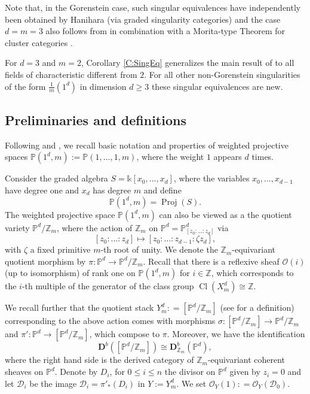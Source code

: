 \documentclass[a4paper,11pt, reqno]{amsart}
\def\P{\mathbb P}
\def\Z{\mathbb Z}
\def\DD{\mathbf D}
\def\OO{\mathcal O}
\def\sD{\mathscr{D}}
\def\Proj{{\operatorname{Proj}}}
\def\Cl{{\operatorname{Cl}}}
\def\Db{\DD^b}
\theoremstyle{plain}
\theoremstyle{definition}
\numberwithin{equation}{section}
\begin{document}
Note that, in the Gorenstein case, such singular equivalences have independently been obtained by Hanihara \cite{Hanihara1, Hanihara2} (via graded singularity categories) and the case  $d=m=3$
also follows from \cite{BIRSc} in combination with a Morita-type Theorem for cluster categories \cite{KellerReiten08}.

For $d=3$ and $m=2$, 
Corollary \ref{C:SingEq} generalizes the main result of \cite{KalckNewSingular} to all fields of characteristic different from $2$. 
For all other non-Gorenstein singularities of the form $\frac{1}{m}(1^d)$ in dimension $d\geq 3$  these singular equivalences are new. 




\subsection{Preliminaries and definitions}\label{sub:prelim} 
Following \cite{dolgachev} and \cite{kawamata0}, we recall basic notation and properties of weighted projective spaces $\P(1^d, m):=\P (1 , \ldots , 1 , m)$, where the weight $1$ appears $d$ times.


Consider the graded algebra $S= \mathbb{k}[x_0 , \ldots , x_d ]$, where the variables $x_0 , \ldots , x_{d-1} $ have degree one and $x_d$ has degree $m$ and define
\[
 \P (1^d , m ) = \Proj ( S ).
\] 
The weighted projective space $\P ( 1^d , m )$ can also be viewed as a the quotient variety $\P^d / \Z_m $, where the action of $\Z_m$ on $\P^d = \P^d_{[z_0 : \ldots : z_d ]}$ via 
\[
[z_0 : \ldots : z_d ] \mapsto [z_0 : \ldots : z_{d-1} : \zeta z_d ],
\]
with $\zeta $ a fixed primitive $m$-th root of unity.
We denote the $\Z_m$-equivariant quotient morphism by $\pi : \P^d \to \P^d / \Z_m$.
Recall that there is a reflexive sheaf $\OO (i)$ (up to isomorphism) of rank one on $\P (1^d , m)$ for $i \in  \Z$, which corresponds to the $i$-th multiple of the generator of the class group $\Cl ( X_m^d )\cong \Z$.

We recall further that the quotient stack $Y_m^d : =  [ \P^d / \Z_m ]$ (see \cite[Section 5]{kawamata0} for a definition) corresponding to the above action comes with  morphisms $\sigma : [ \P^d / \Z_m ] \to \P^d / \Z_m$ and $\pi' : \P^d \to [ \P^d / \Z_m ] $, which compose to $\pi$.
Moreover, we have the identification
\[
\Db ( [\P^d / \Z_m ] ) \cong \Db_{\Z_m} ( \P^d ) ,
\]
where the right hand side is the derived category of $\Z_m$-equivariant coherent sheaves on $\P^d$. 
Denote by $D_i$, for $0\leq i \leq n$ the divisor on $\P^d$ given by $z_i = 0$ and let $\sD_i$ be the image $\sD_i = \pi'_\ast ( D_i )$ in $Y:=Y_m^d$.
We set $\OO_Y (1) : = \OO_Y ( \sD_0 ) $.
\end{document}
